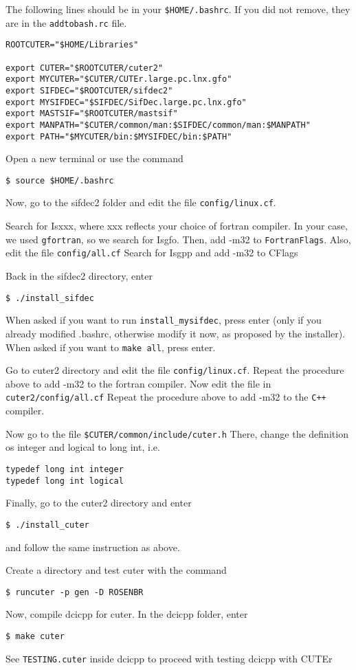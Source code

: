 \documentclass[letterpaper,11pt]{article}
\numberwithin{equation}{section}
\begin{document}
The following lines should be in your \verb+$HOME/.bashrc+. If you did not remove, they are in the \verb+addtobash.rc+ file.
\begin{verbatim}
ROOTCUTER="$HOME/Libraries"

export CUTER="$ROOTCUTER/cuter2"
export MYCUTER="$CUTER/CUTEr.large.pc.lnx.gfo"
export SIFDEC="$ROOTCUTER/sifdec2"
export MYSIFDEC="$SIFDEC/SifDec.large.pc.lnx.gfo"
export MASTSIF="$ROOTCUTER/mastsif"
export MANPATH="$CUTER/common/man:$SIFDEC/common/man:$MANPATH"
export PATH="$MYCUTER/bin:$MYSIFDEC/bin:$PATH"
\end{verbatim}
Open a new terminal or use the command
\begin{verbatim}
$ source $HOME/.bashrc
\end{verbatim}
Now, go to the sifdec2 folder and edit the file \verb+config/linux.cf+.

Search for Isxxx, where xxx reflects your choice of fortran compiler. In your case, we used \verb+gfortran+, so we search for Isgfo. Then, add -m32 to \verb+FortranFlags+.
Also, edit the file \verb+config/all.cf+
Search for Isgpp and add -m32 to CFlags

Back in the sifdec2 directory, enter
\begin{verbatim}
$ ./install_sifdec
\end{verbatim}

When asked if you want to run \verb+install_mysifdec+, press enter (only if you already modified .bashrc, otherwise modify it now, as proposed by the installer).
When asked if you want to \verb+make all+, press enter.

Go to cuter2 directory and edit the file \verb+config/linux.cf+.
Repeat the procedure above to add -m32 to the fortran compiler.
Now edit the file in \verb+cuter2/config/all.cf+
Repeat the procedure above to add -m32 to the \verb-C++- compiler.

Now go to the file \verb+$CUTER/common/include/cuter.h+
There, change the definition os integer and logical to long int, i.e.
\begin{verbatim}
typedef long int integer
typedef long int logical
\end{verbatim}
Finally, go to the cuter2 directory and enter
\begin{verbatim}
$ ./install_cuter
\end{verbatim}
and follow the same instruction as above.

Create a directory and test cuter with the command
\begin{verbatim}
$ runcuter -p gen -D ROSENBR
\end{verbatim}
Now, compile dcicpp for cuter. In the dcicpp folder, enter
\begin{verbatim}
$ make cuter
\end{verbatim}
See \verb+TESTING.cuter+ inside dcicpp to proceed with testing dcicpp with CUTEr
\end{document}
